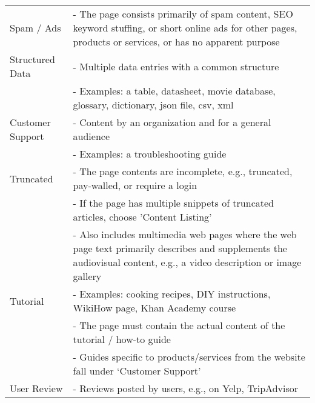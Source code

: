 \begin{table}[!ht]
\begin{tabular}{l@{\hspace{8pt}}p{}}
\addlinespace[0.05in]
Spam / Ads & - The page consists primarily of spam content, SEO keyword stuffing, or short online ads for other pages, products or services, or has no apparent purpose \\
\addlinespace[0.05in]
Structured Data & - Multiple data entries with a common structure \\
            & - Examples: a table, datasheet, movie database, glossary, dictionary, json file, csv, xml \\
\addlinespace[0.05in]
Customer Support &  - Content by an organization and for a general audience \\
            & - Examples: a troubleshooting guide \\
\addlinespace[0.05in]
Truncated & - The page contents are incomplete, e.g., truncated, pay-walled, or require a login \\
            & - If the page has multiple snippets of truncated articles, choose 'Content Listing'\\
            & - Also includes multimedia web pages where the web page text primarily describes and supplements the audiovisual content, e.g., a video description or image gallery \\
\addlinespace[0.05in]
Tutorial & - Examples: cooking recipes, DIY instructions, WikiHow page, Khan Academy course \\
            & - The page must contain the actual content of the tutorial / how-to guide \\
            & - Guides specific to products/services from the website fall under `Customer Support' \\
\addlinespace[0.05in]
User Review & - Reviews posted by users, e.g., on Yelp, TripAdvisor \\
\bottomrule
\end{tabular}
    \icmlskip{-0.1in}
    \label{tab:list_of_formats}
\end{table}
